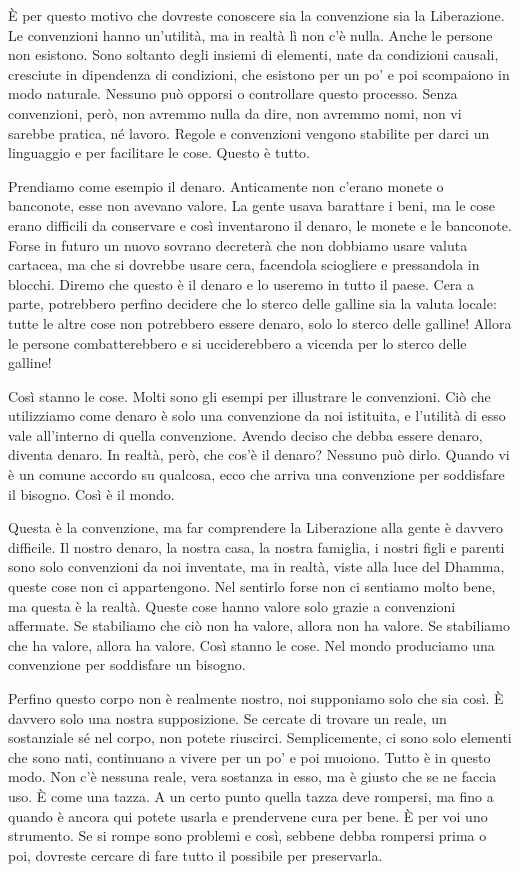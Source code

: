 È per questo motivo che dovreste conoscere sia la convenzione sia la
Liberazione. Le convenzioni hanno un'utilità, ma in realtà lì non c'è
nulla. Anche le persone non esistono. Sono soltanto degli insiemi di
elementi, nate da condizioni causali, cresciute in dipendenza di
condizioni, che esistono per un po' e poi scompaiono in modo naturale.
Nessuno può opporsi o controllare questo processo. Senza convenzioni,
però, non avremmo nulla da dire, non avremmo nomi, non vi sarebbe
pratica, né lavoro. Regole e convenzioni vengono stabilite per darci un
linguaggio e per facilitare le cose. Questo è tutto.

Prendiamo come esempio il denaro. Anticamente non c'erano monete o
banconote, esse non avevano valore. La gente usava barattare i beni, ma
le cose erano difficili da conservare e così inventarono il denaro, le
monete e le banconote. Forse in futuro un nuovo sovrano decreterà che
non dobbiamo usare valuta cartacea, ma che si dovrebbe usare cera,
facendola sciogliere e pressandola in blocchi. Diremo che questo è il
denaro e lo useremo in tutto il paese. Cera a parte, potrebbero perfino
decidere che lo sterco delle galline sia la valuta locale: tutte le
altre cose non potrebbero essere denaro, solo lo sterco delle galline!
Allora le persone combatterebbero e si ucciderebbero a vicenda per lo
sterco delle galline!

Così stanno le cose. Molti sono gli esempi per illustrare le
convenzioni. Ciò che utilizziamo come denaro è solo una convenzione da
noi istituita, e l'utilità di esso vale all'interno di quella
convenzione. Avendo deciso che debba essere denaro, diventa denaro. In
realtà, però, che cos'è il denaro? Nessuno può dirlo. Quando vi è un
comune accordo su qualcosa, ecco che arriva una convenzione per
soddisfare il bisogno. Così è il mondo.

Questa è la convenzione, ma far comprendere la Liberazione alla gente è
davvero difficile. Il nostro denaro, la nostra casa, la nostra famiglia,
i nostri figli e parenti sono solo convenzioni da noi inventate, ma in
realtà, viste alla luce del Dhamma, queste cose non ci appartengono. Nel
sentirlo forse non ci sentiamo molto bene, ma questa è la realtà. Queste
cose hanno valore solo grazie a convenzioni affermate. Se stabiliamo che
ciò non ha valore, allora non ha valore. Se stabiliamo che ha valore,
allora ha valore. Così stanno le cose. Nel mondo produciamo una
convenzione per soddisfare un bisogno.

Perfino questo corpo non è realmente nostro, noi supponiamo solo che sia
così. È davvero solo una nostra supposizione. Se cercate di trovare un
reale, un sostanziale sé nel corpo, non potete riuscirci. Semplicemente,
ci sono solo elementi che sono nati, continuano a vivere per un po' e
poi muoiono. Tutto è in questo modo. Non c'è nessuna reale, vera
sostanza in esso, ma è giusto che se ne faccia uso. È come una tazza. A
un certo punto quella tazza deve rompersi, ma fino a quando è ancora qui
potete usarla e prendervene cura per bene. È per voi uno strumento. Se
si rompe sono problemi e così, sebbene debba rompersi prima o poi,
dovreste cercare di fare tutto il possibile per preservarla.


